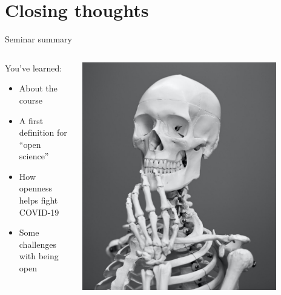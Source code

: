 \section[Closing]{Closing thoughts}
\label{sec:closing}

\begin{frame}{Seminar summary}

	\begin{columns}[c]
		\begin{column}{.45\textwidth}
		    You've learned:
		    \begin{itemize}
			    \item About the course
			    \item A first definition for ``open science''
			    \item How openness helps fight COVID-19
			    \item Some challenges with being open
		    \end{itemize}
		\end{column}

		\begin{column}{.45\textwidth}
		
		    \includegraphics[width=0.85\textwidth]{images/mathew-schwartz-8rj4sz9YLCI-unsplash-crop.jpg}
		    
		\end{column}
		
	\end{columns}

\end{frame}


